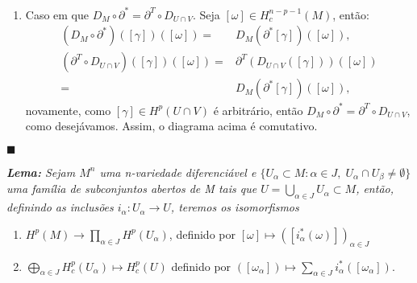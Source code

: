 \documentclass{article}
\newcommand{\cohomologia}[2]{H^{#1}(#2)}
\newcommand{\cohomologiacompac}[2]{H^{#1}_{c}(#2)}
\begin{document}
\begin{enumerate}
	\item Caso em que $D_{M} \circ \partial^{*} = \partial^{T} \circ D_{U \cap V}$. Seja $[\omega] \in H^{n-p-1}_{c}(M)$, então:
		$$
		\begin{aligned}
		(D_{M} \circ \partial^{*} )([\gamma])([\omega]) =& D_{M}(\partial^{*} [\gamma])([\omega]),
		\\
		(\partial^{T} \circ D_{U \cap V} )([\gamma])([\omega])
		=& \partial^{T}(D_{U \cap V} ([\gamma]))([\omega])
		\\
		=& D_{M}(\partial^{*} [\gamma])([\omega]),
		\end{aligned}
		$$
		novamente, como $[\gamma] \in H^{p}(U \cap V)$ é arbitrário, então $D_{M} \circ \partial^{*} = \partial^{T} \circ D_{U \cap V}$, como desejávamos. Assim, o diagrama acima é comutativo.
	\end{enumerate}
	
	$\blacksquare$
	
	\vspace{2mm}
	\textit{\textbf{Lema:} Sejam $M^{n}$ uma n-variedade diferenciável e  $\{U_{\alpha} \subset M: \alpha \in J, \; U_{\alpha} \cap U_{\beta} \neq \emptyset \}$ uma família de subconjuntos abertos de M tais que $U = \bigcup_{\alpha \in J}U_{\alpha} \subset M$, então, definindo as inclusões $i_{\alpha}:U_{\alpha} \to U$, teremos os isomorfismos}
	\begin{enumerate}
		\item $\cohomologia{p}{M} \to \prod_{\alpha \in J} \cohomologia{p}{U_{\alpha}}$, definido por $[\omega] \mapsto ([i^{*}_{\alpha}(\omega)])_{\alpha \in J}$
		
		\item $\bigoplus_{\alpha \in J} \cohomologiacompac{p}{U_{\alpha}} \mapsto \cohomologiacompac{p}{U}$ definido por $([\omega_{\alpha}]) \mapsto \sum_{\alpha \in J} i^{*}_{\alpha}([\omega_{\alpha}])$.
	\end{enumerate}
	
\end{document}
